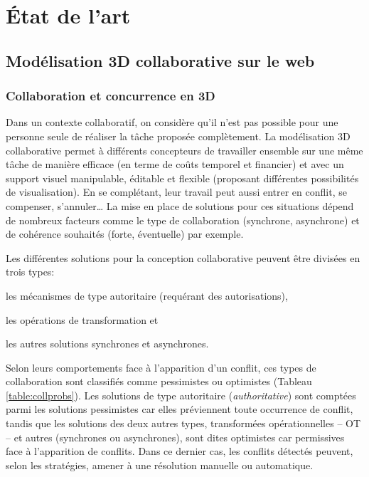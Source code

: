 \chapter{État de l'art}
\chaptertable


\section{Modélisation 3D collaborative sur le web}

\subsection{Collaboration et concurrence en 3D}
Dans un contexte collaboratif, on considère qu'il n'est pas possible pour une 
personne seule de réaliser la tâche proposée complètement. 
La modélisation 3D collaborative permet à différents concepteurs de travailler 
ensemble sur une même tâche de manière efficace (en terme de coûts temporel et 
financier) et avec un support visuel manipulable, éditable et flexible (proposant 
différentes possibilités de visualisation). 
En se complétant, leur travail peut aussi entrer en conflit, se compenser, 
s'annuler\ldots
La mise en place de solutions pour ces situations dépend de nombreux facteurs 
comme le type de collaboration (synchrone, asynchrone) et de cohérence souhaités 
(forte, éventuelle) par exemple.

Les différentes solutions pour la conception collaborative peuvent être divisées en 
trois types: 
\begin{enumerate*}[label=(\roman*)]
	\item les mécanismes de type autoritaire (requérant des autorisations),
	\item les opérations de transformation et 
	\item les autres solutions synchrones et asynchrones.
\end{enumerate*}
Selon leurs comportements face à l'apparition d'un conflit, ces types de 
collaboration sont classifiés comme pessimistes ou optimistes (Tableau 
\ref{table:collprobs}). Les solutions de type autoritaire (\og \textit{authoritative}\fg{}) 
sont comptées parmi les solutions pessimistes car elles préviennent toute 
occurrence de conflit, tandis que les solutions des deux autres types,
transformées opérationnelles -- \gls{OT} -- et autres (synchrones ou asynchrones), 
sont dites optimistes car permissives face à l'apparition de conflits. 
Dans ce dernier cas, les conflits détectés peuvent, selon les stratégies, amener à 
une résolution manuelle ou automatique.


